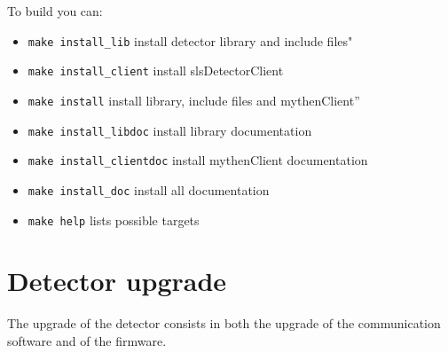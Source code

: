 \documentclass{report}
\begin{document}
To build you can:
\begin{itemize}
\item \verb=make install_lib=       install detector library and include files"
\item \verb=make install_client=     install slsDetectorClient
\item \verb=make install=            install library, include files and mythenClient'' 
\item \verb=make install_libdoc=     install library documentation
\item \verb=make install_clientdoc=  install mythenClient documentation
\item \verb=make install_doc=        install all documentation
\item \verb=make help=               lists possible targets
\end{itemize}

\section{Detector upgrade}

The upgrade of the detector consists in both the upgrade of the communication software and of the firmware.\\
\end{document}
